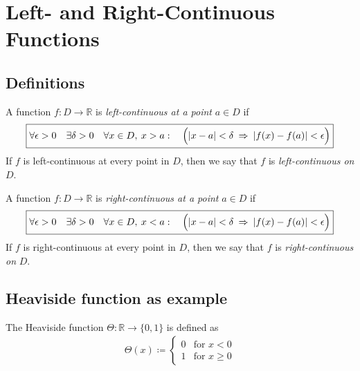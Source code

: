 \section{Left- and Right-Continuous Functions}


\subsection{Definitions}

\begin{definition}
    A function $f : D \to \mathbb{R}$ is \textit{left-continuous at a point} $a \in D$ if
    \begin{align*}
    \boxed{
        \forall \epsilon > 0 \quad \exists \delta > 0
        \quad \forall x \in D, \: x > a: \quad
        \Bigl(|x - a| < \delta \: \implies \: |f(x) - f(a)| < \epsilon \Bigr)
    }
    \end{align*}
    If $f$ is left-continuous at every point in $D$, then we say that $f$ is \textit{left-continuous on} $D$.
\end{definition}

\begin{definition}
    A function $f : D \to \mathbb{R}$ is \textit{right-continuous at a point} $a \in D$ if
    \begin{align*}
    \boxed{
        \forall \epsilon > 0 \quad \exists \delta > 0
        \quad \forall x \in D, \: x < a: \quad
        \Bigl(|x - a| < \delta \: \implies \: |f(x) - f(a)| < \epsilon \Bigr)
    }
    \end{align*}
    If $f$ is right-continuous at every point in $D$, then we say that $f$ is \textit{right-continuous on} $D$.
\end{definition}




\subsection{Heaviside function as example}

\begin{definition}
    The Heaviside function $\Theta : \mathbb{R} \to \{0, 1\}$ is defined as
    \begin{align*}
        \Theta(x) \coloneqq \begin{cases} 
            0 & \text{for } x < 0 \\
            1 & \text{for } x \geq 0
        \end{cases}
    \end{align*}
\end{definition}


